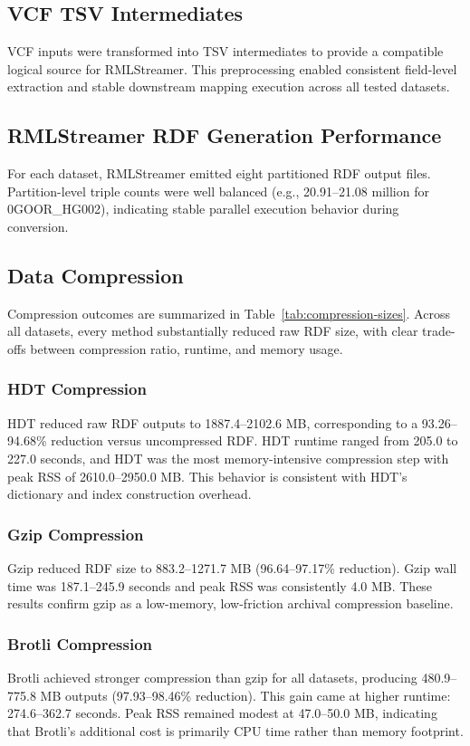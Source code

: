 \documentclass[unnumsec,webpdf,contemporary,large]{oup-authoring-template}
\begin{document}
\subsection{VCF TSV Intermediates}\label{subsec3.2}
VCF inputs were transformed into TSV intermediates to provide a compatible logical source for RMLStreamer.
This preprocessing enabled consistent field-level extraction and stable downstream mapping execution across all tested datasets.


\subsection{RMLStreamer RDF Generation Performance}\label{subsec3.3}
For each dataset, RMLStreamer emitted eight partitioned RDF output files.
Partition-level triple counts were well balanced (e.g., 20.91--21.08 million for 0GOOR\_HG002), indicating stable parallel execution behavior during conversion.


\subsection{Data Compression}\label{subsec3.4}
Compression outcomes are summarized in Table~\ref{tab:compression-sizes}.
Across all datasets, every method substantially reduced raw RDF size, with clear trade-offs between compression ratio, runtime, and memory usage.

\subsubsection{HDT Compression}\label{subsec3.4.1}
HDT reduced raw RDF outputs to 1887.4--2102.6 MB, corresponding to a 93.26--94.68\% reduction versus uncompressed RDF.
HDT runtime ranged from 205.0 to 227.0 seconds, and HDT was the most memory-intensive compression step with peak RSS of 2610.0--2950.0 MB.
This behavior is consistent with HDT's dictionary and index construction overhead.

\subsubsection{Gzip Compression}\label{subsec3.4.2}
Gzip reduced RDF size to 883.2--1271.7 MB (96.64--97.17\% reduction).
Gzip wall time was 187.1--245.9 seconds and peak RSS was consistently 4.0 MB.
These results confirm gzip as a low-memory, low-friction archival compression baseline.

\subsubsection{Brotli Compression}\label{subsec3.4.3}
Brotli achieved stronger compression than gzip for all datasets, producing 480.9--775.8 MB outputs (97.93--98.46\% reduction).
This gain came at higher runtime: 274.6--362.7 seconds.
Peak RSS remained modest at 47.0--50.0 MB, indicating that Brotli's additional cost is primarily CPU time rather than memory footprint.
\end{document}
